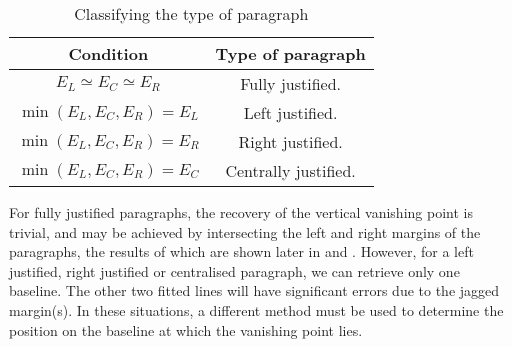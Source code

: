 \begin{table}[t]
  \begin{center}
    \begin{tabular}{|c|c|}
      \hline
      {\bf Condition} & {\bf Type of paragraph} \\
      \hline \hline
      $E_L \simeq E_C \simeq E_R$ & Fully justified. \\
      \hline
      $\min(E_L,E_C,E_R)=E_L$ & Left justified. \\
      \hline
      $\min(E_L,E_C,E_R)=E_R$ & Right justified. \\
      \hline
      $\min(E_L,E_C,E_R)=E_C$ & Centrally justified. \\
      \hline
    \end{tabular}
  \end{center}
  \caption{Classifying the type of paragraph}
  \label{typeofparatable}
\end{table}



For fully justified paragraphs, the recovery of the vertical vanishing point is
trivial, and may be achieved by intersecting the left and right margins of the
paragraphs, the results of which are shown later in  and
.  However, for a left justified, right justified or
centralised paragraph, we can retrieve only one baseline.  The other two fitted
lines will have significant errors due to the jagged margin(s).  In these
situations, a different method must be used to determine the position on the
baseline at which the vanishing point lies.





